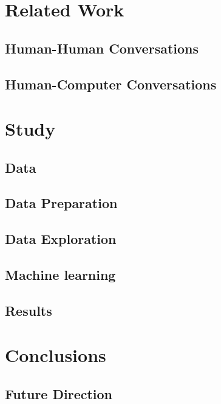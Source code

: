 \documentclass[copyright,masters]{cslu-thesis}
\begin{document}
\chapter{Related Work}

\section{Human-Human Conversations}

\section{Human-Computer Conversations}

\chapter{Study}
\section{Data}

\section{Data Preparation}

\section{Data Exploration}

\section{Machine learning}

\section{Results}

\chapter{Conclusions}

\section{Future Direction}



\appendix


\nocite{*} %


\end{document}
